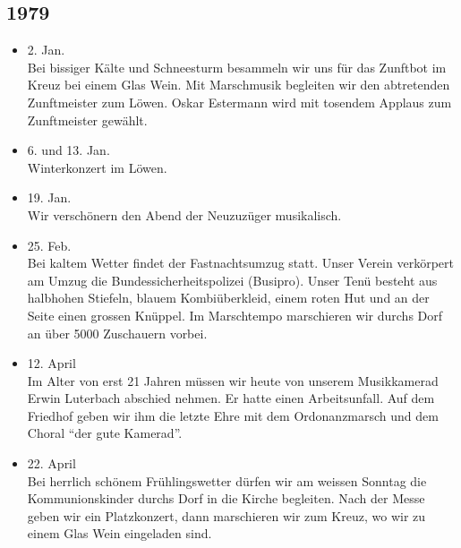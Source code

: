 \subsection{1979}

\begin{history}


    \begin{itemize}

        \item 2. Jan.\\
              Bei bissiger Kälte und Schneesturm besammeln wir uns für das Zunftbot im
              Kreuz bei einem Glas Wein. Mit Marschmusik begleiten wir den abtretenden
              Zunftmeister zum Löwen. Oskar Estermann wird mit tosendem Applaus zum
              Zunftmeister gewählt.

        \item 6. und 13. Jan.\\
              Winterkonzert im Löwen.

        \item 19. Jan.\\
              Wir verschönern den Abend der Neuzuzüger musikalisch.

        \item 25. Feb.\\
              Bei kaltem Wetter findet der Fastnachtsumzug statt. Unser Verein
              verkörpert am Umzug die Bundessicherheitspolizei (Busipro). Unser Tenü
              besteht aus halbhohen Stiefeln, blauem Kombiüberkleid, einem roten Hut
              und an der Seite einen grossen Knüppel. Im Marschtempo marschieren wir
              durchs Dorf an über 5000 Zuschauern vorbei.

        \item 12. April\\
              Im Alter von erst 21 Jahren müssen wir heute von unserem Musikkamerad
              Erwin Luterbach abschied nehmen. Er hatte einen Arbeitsunfall. Auf dem
              Friedhof geben wir ihm die letzte Ehre mit dem Ordonanzmarsch und dem
              Choral \enquote{der gute Kamerad}.

        \item 22. April\\
              Bei herrlich schönem Frühlingswetter dürfen wir am weissen Sonntag die
              Kommunionskinder durchs Dorf in die Kirche begleiten. Nach der Messe
              geben wir ein Platzkonzert, dann marschieren wir zum Kreuz, wo wir zu
              einem Glas Wein eingeladen sind.


\end{itemize}
\end{history}
